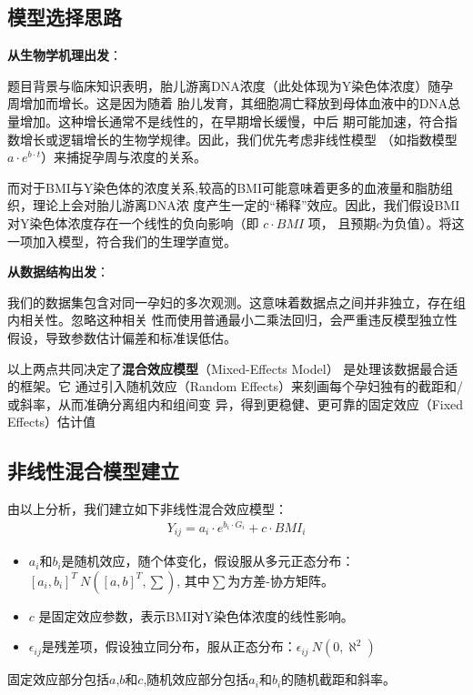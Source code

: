 \documentclass{article}
\begin{document}
\subsection{\textbf{模型选择思路}}
\textbf{从生物学机理出发}：

题目背景与临床知识表明，胎儿游离DNA浓度（此处体现为Y染色体浓度）随孕周增加而增长。这是因为随着
胎儿发育，其细胞凋亡释放到母体血液中的DNA总量增加。这种增长通常不是线性的，在早期增长缓慢，中后
期可能加速，符合指数增长或逻辑增长的生物学规律。因此，我们优先考虑非线性模型
（如指数模型 $a\cdot e^{b\cdot t}$）来捕捉孕周与浓度的关系。

而对于BMI与Y染色体的浓度关系,较高的BMI可能意味着更多的血液量和脂肪组织，理论上会对胎儿游离DNA浓
度产生一定的“稀释”效应。因此，我们假设BMI对Y染色体浓度存在一个线性的负向影响（即 $c\cdot BMI$ 项，
且预期$c$为负值）。将这一项加入模型，符合我们的生理学直觉。

\textbf{从数据结构出发}：

我们的数据集包含对同一孕妇的多次观测。这意味着数据点之间并非独立，存在组内相关性。忽略这种相关
性而使用普通最小二乘法回归，会严重违反模型独立性假设，导致参数估计偏差和标准误低估。

以上两点共同决定了\textbf{混合效应模型}（Mixed-Effects Model） 是处理该数据最合适的框架。它
通过引入随机效应（Random Effects）来刻画每个孕妇独有的截距和/或斜率，从而准确分离组内和组间变
异，得到更稳健、更可靠的固定效应（Fixed Effects）估计值
\subsection{\textbf{非线性混合模型建立}}
由以上分析，我们建立如下非线性混合效应模型：
\begin{gather}
    Y_{ij}=a_i\cdot e^{b_i\cdot G_i}+c\cdot BMI_i \tag{1}
\end{gather}
\begin{itemize}
    \item $a_i$和$b_i$是随机效应，随个体变化，假设服从多元正态分布：$[a_i,b_i]^T~N([a,b]^T,\sum)$,
          其中$\sum$为方差-协方矩阵。
    \item $c$ 是固定效应参数，表示BMI对Y染色体浓度的线性影响。
    \item $\epsilon_{ij}$是残差项，假设独立同分布，服从正态分布：$\epsilon_{ij}~N(0,\aleph^2)$
\end{itemize}
固定效应部分包括$a$,$b$和$c$,随机效应部分包括$a_i$和$b_i$的随机截距和斜率。
\end{document}
